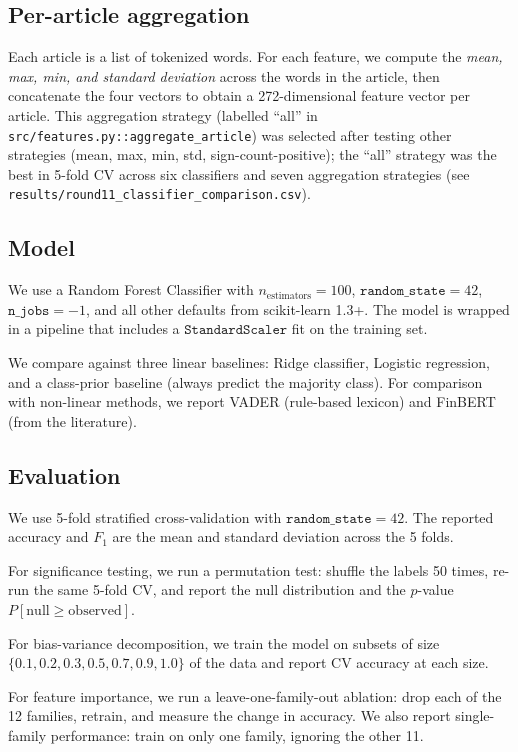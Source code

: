 \documentclass{article}
\begin{document}
\subsection{Per-article aggregation}

Each article is a list of tokenized words. For each feature, we compute the \emph{mean, max, min, and standard deviation} across the words in the article, then concatenate the four vectors to obtain a 272-dimensional feature vector per article. This aggregation strategy (labelled ``all'' in \texttt{src/features.py::aggregate\_article}) was selected after testing other strategies (mean, max, min, std, sign-count-positive); the ``all'' strategy was the best in 5-fold CV across six classifiers and seven aggregation strategies (see \texttt{results/round11\_classifier\_comparison.csv}).

\subsection{Model}

We use a Random Forest Classifier with $n_\text{estimators} = 100$, $\texttt{random\_state} = 42$, $\texttt{n\_jobs} = -1$, and all other defaults from scikit-learn 1.3+. The model is wrapped in a pipeline that includes a $\texttt{StandardScaler}$ fit on the training set.

We compare against three linear baselines: Ridge classifier, Logistic regression, and a class-prior baseline (always predict the majority class). For comparison with non-linear methods, we report VADER (rule-based lexicon) and FinBERT (from the literature).

\subsection{Evaluation}

We use 5-fold stratified cross-validation with $\texttt{random\_state}=42$. The reported accuracy and $F_1$ are the mean and standard deviation across the 5 folds.

For significance testing, we run a permutation test: shuffle the labels 50 times, re-run the same 5-fold CV, and report the null distribution and the $p$-value $P[\text{null} \geq \text{observed}]$.

For bias-variance decomposition, we train the model on subsets of size $\{0.1, 0.2, 0.3, 0.5, 0.7, 0.9, 1.0\}$ of the data and report CV accuracy at each size.

For feature importance, we run a leave-one-family-out ablation: drop each of the 12 families, retrain, and measure the change in accuracy. We also report single-family performance: train on only one family, ignoring the other 11.
\end{document}
